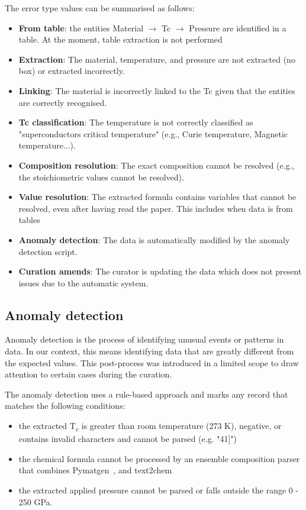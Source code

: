 \documentclass[a4paper]{article}
\begin{document}
The error type values can be summarised as follows: 

\begin{itemize}
    \item \textbf{From table}: the entities Material $\rightarrow$ Tc $\rightarrow$ Pressure are identified in a table. At the moment, table extraction is not performed
    \item \textbf{Extraction}: The material, temperature, and pressure are not extracted (no box) or extracted incorrectly. 
    \item \textbf{Linking}: The material is incorrectly linked to the Tc given that the entities are correctly recognised.
    \item \textbf{Tc classification}: The temperature is not correctly classified as "superconductors critical temperature" (e.g., Curie temperature, Magnetic temperature...).
    \item \textbf{Composition resolution}: The exact composition cannot be resolved (e.g., the stoichiometric values cannot be resolved).
    \item \textbf{Value resolution}: The extracted formula contains variables that cannot be resolved, even after having read the paper. This includes when data is from tables
    \item \textbf{Anomaly detection}: The data is automatically modified by the anomaly detection script.
    \item \textbf{Curation amends}: The curator is updating the data which does not present issues due to the automatic system.
\end{itemize}

\subsection{Anomaly detection}
\label{subsec:anomaly-detection}
Anomaly detection is the process of identifying unusual events or patterns in data. 
In our context, this means identifying data that are greatly different from the expected values.
This post-process was introduced in a limited scope to draw attention to certain cases during the curation.

The anomaly detection uses a rule-based approach and marks any record that matches the following conditions:
\begin{itemize}
    \item the extracted T\textsubscript{c} is greater than room temperature (273 K), negative, or contains invalid characters and cannot be parsed (e.g. "41]")
    \item the chemical formula cannot be processed by an ensemble composition parser that combines Pymatgen~\cite{Ong2013}, and text2chem~\cite{kononova_text-mined_2019} 
    \item the extracted applied pressure cannot be parsed or falls outside the range 0 - 250 GPa.
\end{itemize}
\end{document}

